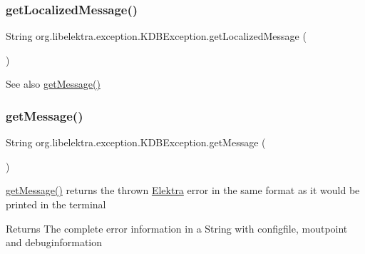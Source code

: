 \subsubsection{\texorpdfstring{get\+Localized\+Message()}{getLocalizedMessage()}}
{\footnotesize\ttfamily String org.\+libelektra.\+exception.\+K\+D\+B\+Exception.\+get\+Localized\+Message (\begin{DoxyParamCaption}{ }\end{DoxyParamCaption})\hspace{0.3cm}{\ttfamily [inline]}}

\begin{DoxySeeAlso}{See also}
\hyperlink{classorg_1_1libelektra_1_1exception_1_1KDBException_a78bbf7b7767f90840ba6bdb22bebfe11}{get\+Message()} 
\end{DoxySeeAlso}
\mbox{\label{classorg_1_1libelektra_1_1exception_1_1KDBException_a78bbf7b7767f90840ba6bdb22bebfe11}} 
\subsubsection{\texorpdfstring{get\+Message()}{getMessage()}}
{\footnotesize\ttfamily String org.\+libelektra.\+exception.\+K\+D\+B\+Exception.\+get\+Message (\begin{DoxyParamCaption}{ }\end{DoxyParamCaption})\hspace{0.3cm}{\ttfamily [inline]}}



\hyperlink{classorg_1_1libelektra_1_1exception_1_1KDBException_a78bbf7b7767f90840ba6bdb22bebfe11}{get\+Message()} returns the thrown \hyperlink{interfaceorg_1_1libelektra_1_1Elektra}{Elektra} error in the same format as it would be printed in the terminal 

\begin{DoxyReturn}{Returns}
The complete error information in a String with configfile, moutpoint and debuginformation 
\end{DoxyReturn}
\mbox{\label{classorg_1_1libelektra_1_1exception_1_1KDBException_a241bb6bc3b93677bc4b51d23b917f9d1}} 

